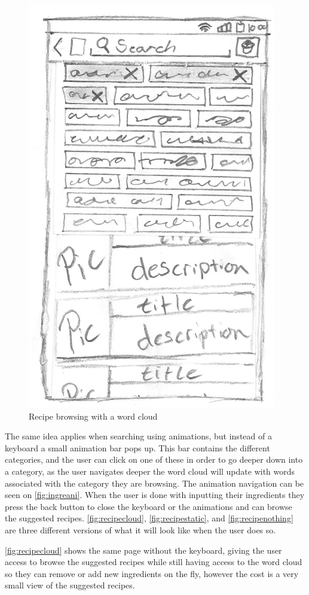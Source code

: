 \begin{figure}[H]
\begin{minipage}[b]{0.5\columnwidth}
\includegraphics[width=0.7\columnwidth]{img/prototypes/recipe_browse.pdf}
\caption{Recipe browsing with a word cloud\label{fig:recipecloud}}
\end{minipage}
\end{figure}

The same idea applies when searching using animations, but instead of a keyboard a small animation bar pops up. This bar contains the different categories, and the user can click on one of these in order to go deeper down into a category, as the user navigates deeper the word cloud will update with words associated with the category they are browsing. The animation navigation can be seen on \autoref{fig:ingreani}. When the user is done with inputting their ingredients they press the back button to close the keyboard or the animations and can browse the suggested recipes. \autoref{fig:recipecloud}, \autoref{fig:recipestatic}, and \autoref{fig:recipenothing} are three different versions of what it will look like when the user does so.

\autoref{fig:recipecloud} shows the same page without the keyboard, giving the user access to browse the suggested recipes while still having access to the word cloud so they can remove or add new ingredients on the fly, however the cost is a very small view of the suggested recipes. 

